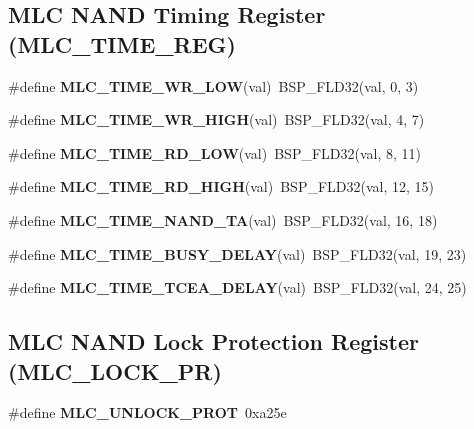 \subsection*{M\+LC N\+A\+ND Timing Register (M\+L\+C\+\_\+\+T\+I\+M\+E\+\_\+\+R\+EG)}
\begin{DoxyCompactItemize}
\item 
\mbox{\label{group__lpc32xx__nand__mlc_ga65d3d982478162a5cce8574c610427e1}} 
\#define {\bfseries M\+L\+C\+\_\+\+T\+I\+M\+E\+\_\+\+W\+R\+\_\+\+L\+OW}(val)~B\+S\+P\+\_\+\+F\+L\+D32(val, 0, 3)
\item 
\mbox{\label{group__lpc32xx__nand__mlc_gaaa0320f8f123788c964b749abf8ddc55}} 
\#define {\bfseries M\+L\+C\+\_\+\+T\+I\+M\+E\+\_\+\+W\+R\+\_\+\+H\+I\+GH}(val)~B\+S\+P\+\_\+\+F\+L\+D32(val, 4, 7)
\item 
\mbox{\label{group__lpc32xx__nand__mlc_gaf653199e9228166ae1be2aeba0f87b62}} 
\#define {\bfseries M\+L\+C\+\_\+\+T\+I\+M\+E\+\_\+\+R\+D\+\_\+\+L\+OW}(val)~B\+S\+P\+\_\+\+F\+L\+D32(val, 8, 11)
\item 
\mbox{\label{group__lpc32xx__nand__mlc_ga0c76ec29d96d3deddd0ee4c3e33a4291}} 
\#define {\bfseries M\+L\+C\+\_\+\+T\+I\+M\+E\+\_\+\+R\+D\+\_\+\+H\+I\+GH}(val)~B\+S\+P\+\_\+\+F\+L\+D32(val, 12, 15)
\item 
\mbox{\label{group__lpc32xx__nand__mlc_ga3f5e99228315ac86924a0f4a66cbe9b0}} 
\#define {\bfseries M\+L\+C\+\_\+\+T\+I\+M\+E\+\_\+\+N\+A\+N\+D\+\_\+\+TA}(val)~B\+S\+P\+\_\+\+F\+L\+D32(val, 16, 18)
\item 
\mbox{\label{group__lpc32xx__nand__mlc_gab97add83fdc7a7b4fff0a76390970fa1}} 
\#define {\bfseries M\+L\+C\+\_\+\+T\+I\+M\+E\+\_\+\+B\+U\+S\+Y\+\_\+\+D\+E\+L\+AY}(val)~B\+S\+P\+\_\+\+F\+L\+D32(val, 19, 23)
\item 
\mbox{\label{group__lpc32xx__nand__mlc_ga8781d8a70eb465b95c6829d1435da18e}} 
\#define {\bfseries M\+L\+C\+\_\+\+T\+I\+M\+E\+\_\+\+T\+C\+E\+A\+\_\+\+D\+E\+L\+AY}(val)~B\+S\+P\+\_\+\+F\+L\+D32(val, 24, 25)
\end{DoxyCompactItemize}
\subsection*{M\+LC N\+A\+ND Lock Protection Register (M\+L\+C\+\_\+\+L\+O\+C\+K\+\_\+\+PR)}
\begin{DoxyCompactItemize}
\item 
\mbox{\label{group__lpc32xx__nand__mlc_ga7a07a0271683f98cbee28398f487ff55}} 
\#define {\bfseries M\+L\+C\+\_\+\+U\+N\+L\+O\+C\+K\+\_\+\+P\+R\+OT}~0xa25e
\end{DoxyCompactItemize}
